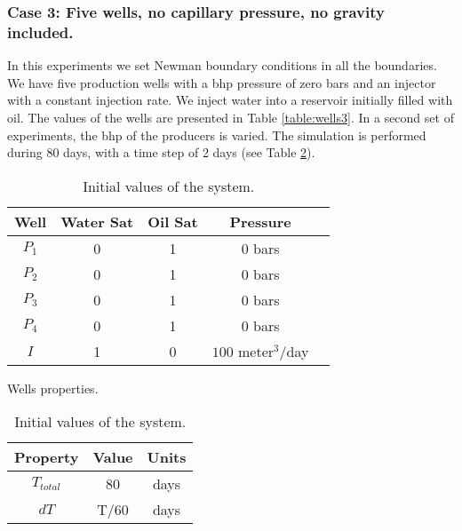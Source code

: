 \documentclass[12pt]{article}
\begin{document}
\subsubsection*{Case 3: Five wells, no capillary pressure, no gravity included.}
In this experiments we set Newman boundary conditions in all the boundaries. We have five production wells with a bhp pressure of zero bars and an injector with a constant injection rate. We inject water into a reservoir initially filled with oil. The values of the wells are presented in Table \ref{table:wells3}. In a second set of experiments, the bhp of the producers is varied. The simulation is performed during 80 days, with a time step of 2 days (see Table \ref{table:icw}).  
\begin{table}[!ht]
\hspace{-0cm}
\begin{minipage}{.5\textwidth}
\centering
\begin{tabular}{ |c|c|c|c|c|} 
\hline
Well&Water Sat&Oil Sat&Pressure\\
\hline
$P_1$&     0&    1 & $0$ bars \\  
$P_2$& 0& 1& $0$ bars\\
$P_3$&     0&    1 & $0$ bars \\  
$P_4$& 0& 1& $0$ bars\\
$I$&     1&    0 & $100$ meter$^3$/day\\  
\hline
\end{tabular}
\caption{Wells properties.}\label{table:wells3}
\end{minipage}%
\begin{minipage}{.4\textwidth}
\centering
\begin{tabular}{ |c|c|c|} 
\hline
Property&Value&Units\\
\hline
    $T_{total}$&     80& days\\
$dT$& T/60&days\\
\hline
\end{tabular}\caption{Initial values of the system.}
\label{table:icw}
\end{minipage}
\hspace{1cm} 
\end{table} 
\end{document}
